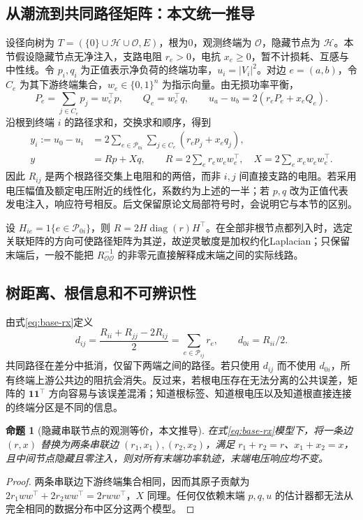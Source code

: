 \documentclass[UTF8,11pt,fontset=fandol]{ctexart}
\DeclareMathOperator{\diag}{diag}
\newtheorem{proposition}{命题}[section]
\theoremstyle{remark}
\numberwithin{equation}{section}
\begin{document}
\subsection{从潮流到共同路径矩阵：本文统一推导}
设径向树为 $T=(\{0\}\cup\mathcal H\cup\mathcal O,E)$，根为0，观测终端为 $\mathcal O$，隐藏节点为 $\mathcal H$。本节假设隐藏节点无净注入，支路电阻 $r_e>0$，电抗 $x_e\geq0$，暂不计损耗、互感与中性线。令 $p_i,q_i$ 为正值表示净负荷的终端功率，$u_i=|V_i|^2$。对边 $e=(a,b)$，令 $C_e$ 为其下游终端集合，$w_e\in\{0,1\}^n$ 为指示向量。由无损功率平衡，
\begin{equation}
 P_e=\sum_{j\in C_e}p_j=w_e^\top p,\qquad Q_e=w_e^\top q,
 \qquad u_a-u_b=2(r_eP_e+x_eQ_e).
\end{equation}
沿根到终端 $i$ 的路径求和，交换求和顺序，得到
\begin{align}
 y_i:=u_0-u_i
 &=2\sum_{e\in\mathcal P_{0i}}\sum_{j\in C_e}(r_ep_j+x_eq_j),\\
 y&=Rp+Xq,\qquad
 R=2\sum_e r_ew_ew_e^\top,\quad X=2\sum_e x_ew_ew_e^\top.
 \label{eq:base-rx}
\end{align}
因此 $R_{ij}$ 是两个根路径交集上电阻和的两倍，而非 $i,j$ 间直接支路的电阻。若采用电压幅值及额定电压附近的线性化，系数约为上述的一半；若 $p,q$ 改为正值代表发电注入，响应符号相反。后文保留原论文局部符号时，会说明它与本节的区别。

设 $H_{ie}=1\{e\in\mathcal P_{0i}\}$，则 $R=2H\diag(r)H^\top$。在全部非根节点都列入时，选定关联矩阵的方向可使路径矩阵为其逆，故逆灵敏度是加权约化Laplacian；只保留末端后，一般不能把 $R_{\mathcal O\mathcal O}^{-1}$ 的非零元直接解释成末端之间的实际线路。

\subsection{树距离、根信息和不可辨识性}
由式\eqref{eq:base-rx}定义
\begin{equation}
 d_{ij}=\frac{R_{ii}+R_{jj}-2R_{ij}}{2}
       =\sum_{e\in\mathcal P_{ij}}r_e,
 \qquad d_{0i}=R_{ii}/2.
 \label{eq:base-distance}
\end{equation}
共同路径在差分中抵消，仅留下两端之间的路径。若只使用 $d_{ij}$ 而不使用 $d_{0i}$，所有终端上游公共边的阻抗会消失。反过来，若根电压存在无法分离的公共误差，矩阵的 $\mathbf1\mathbf1^\top$ 方向容易与该误差混淆；知道根标签、知道根电压以及知道根直接连接的终端分区是不同的信息。

\begin{proposition}[隐藏串联节点的观测等价，本文推导]
在式\eqref{eq:base-rx}模型下，将一条边 $(r,x)$ 替换为两条串联边 $(r_1,x_1),(r_2,x_2)$，满足 $r_1+r_2=r$、$x_1+x_2=x$，且中间节点隐藏且零注入，则对所有末端功率轨迹，末端电压响应均不变。
\end{proposition}
\begin{proof}
两条串联边下游终端集合相同，因而其原子贡献为
$2r_1ww^\top+2r_2ww^\top=2rww^\top$，$X$ 同理。任何仅依赖末端 $p,q,u$ 的估计器都无法从完全相同的数据分布中区分这两个模型。
\end{proof}
\end{document}
